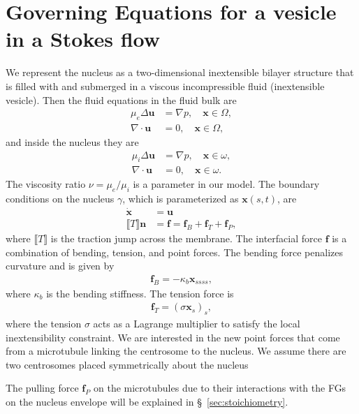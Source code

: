 \documentclass[11pt]{article}
\newcommand{\ff}{\mathbf{f}}
\newcommand{\nn}{\mathbf{n}}
\newcommand{\uu}{\mathbf{u}}
\newcommand{\xx}{\mathbf{x}}
\begin{document}
\section{Governing Equations for a vesicle in a Stokes flow}
We represent the nucleus as a two-dimensional inextensible bilayer
structure that is filled with and submerged in a viscous incompressible
fluid (inextensible vesicle).  Then the fluid equations in the fluid
bulk are
\begin{align}
  \mu_e \Delta \uu &= \nabla p, \quad \xx \in \Omega, \\
  \nabla \cdot \uu &= 0, \quad \xx \in \Omega,
\end{align}
and inside the nucleus they are
\begin{align}
  \mu_i \Delta \uu &= \nabla p, \quad \xx \in \omega, \\
  \nabla \cdot \uu &= 0, \quad \xx \in \omega.
\end{align}
The viscosity ratio $\nu = \mu_e/\mu_i$ is a parameter in our model.  The
boundary conditions on the nucleus $\gamma$, which is parameterized as
$\xx(s,t)$, are 
\begin{align}
  \dot{\xx} &= \uu \\
  \llbracket T \rrbracket \nn &= \ff = \ff_B + \ff_T +\ff_P,
\end{align}
where $\llbracket T \rrbracket$ is the traction jump across the
membrane.  The interfacial force $\ff$ is a combination of bending,
tension, and point forces.  The bending force penalizes curvature and is
given by
\begin{align}
  \ff_B = -\kappa_b \xx_{ssss},
\end{align}
where $\kappa_b$ is the bending stiffness.  The tension force is
\begin{align}
  \ff_T = (\sigma \xx_s)_s,
\end{align}
where the tension $\sigma$ acts as a Lagrange multiplier to satisfy the
local inextensibility constraint.  We are interested in the new point
forces that come from a microtubule linking the centrosome to the
nucleus.  We assume there are two centrosomes placed symmetrically about
the nucleus

The pulling force $\ff_P$ on the microtubules due to their interactions with the FGs 
on the nucleus envelope will be explained in \S~\ref{sec:stoichiometry}.

\end{document}
